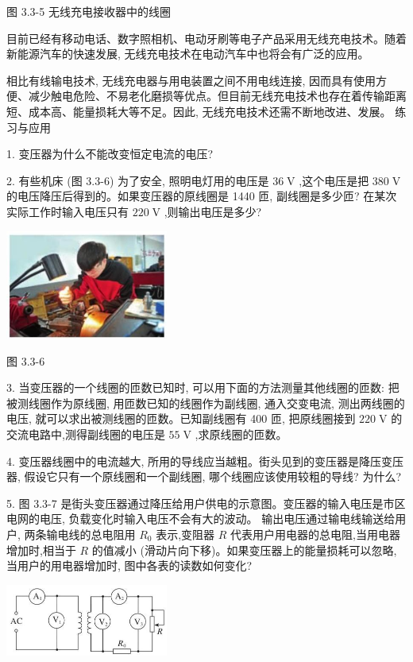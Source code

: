 \documentclass[10pt]{article}
\begin{document}
图 3.3-5 无线充电接收器中的线圈

目前已经有移动电话、数字照相机、电动牙刷等电子产品采用无线充电技术。随着新能源汽车的快速发展, 无线充电技术在电动汽车中也将会有广泛的应用。

相比有线输电技术, 无线充电器与用电装置之间不用电线连接, 因而具有使用方便、减少触电危险、不易老化磨损等优点。但目前无线充电技术也存在着传输距离短、成本高、能量损耗大等不足。因此, 无线充电技术还需不断地改进、发展。 练习与应用

1. 变压器为什么不能改变恒定电流的电压?

2. 有些机床 (图 3.3-6) 为了安全, 照明电灯用的电压是 \({36}\mathrm{\;V}\) ,这个电压是把 \({380}\mathrm{\;V}\) 的电压降压后得到的。如果变压器的原线圈是 1440 匝, 副线圈是多少匝? 在某次实际工作时输入电压只有 \({220}\mathrm{\;V}\) ,则输出电压是多少?

\begin{center}
\includegraphics[max width=0.4\textwidth]{images/01910e72-c5b7-7ed5-a6d4-fb3a5faefc32_67_272238.jpg}
\end{center}

图 3.3-6

3. 当变压器的一个线圈的匝数已知时, 可以用下面的方法测量其他线圈的匝数: 把被测线圈作为原线圈, 用匝数已知的线圈作为副线圈, 通入交变电流, 测出两线圈的电压, 就可以求出被测线圈的匝数。已知副线圈有 400 匝, 把原线圈接到 \({220}\mathrm{\;V}\) 的交流电路中,测得副线圈的电压是 \({55}\mathrm{\;V}\) ,求原线圈的匝数。

4. 变压器线圈中的电流越大, 所用的导线应当越粗。街头见到的变压器是降压变压器, 假设它只有一个原线圈和一个副线圈, 哪个线圈应该使用较粗的导线? 为什么?

5. 图 3.3-7 是街头变压器通过降压给用户供电的示意图。变压器的输入电压是市区电网的电压, 负载变化时输入电压不会有大的波动。 输出电压通过输电线输送给用户, 两条输电线的总电阻用 \({R}_{0}\) 表示,变阻器 \(R\) 代表用户用电器的总电阻,当用电器增加时,相当于 \(R\) 的值减小 (滑动片向下移)。如果变压器上的能量损耗可以忽略, 当用户的用电器增加时, 图中各表的读数如何变化?

\begin{center}
\includegraphics[max width=0.4\textwidth]{images/01910e72-c5b7-7ed5-a6d4-fb3a5faefc32_67_571509.jpg}
\end{center}
\end{document}

